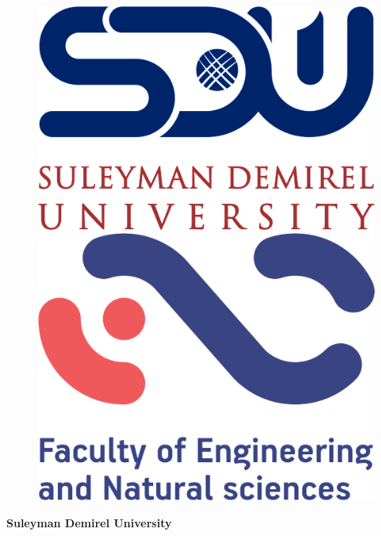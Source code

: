 \newpage
\pagestyle{empty}
\begin{center}
\large

\begin{figure}[h]
    \centering
    \begin{minipage}{0.2\textwidth}
        \includegraphics[scale=0.2]{figures/logoNew.png}
    \end{minipage}
    \hspace*{0.8cm}
    \begin{minipage}{0.2\textwidth}
        \includegraphics[scale=0.2]{figures/logonew2.png}
    \end{minipage}
\end{figure}

\textbf{Suleyman Demirel University}


\end{center}

